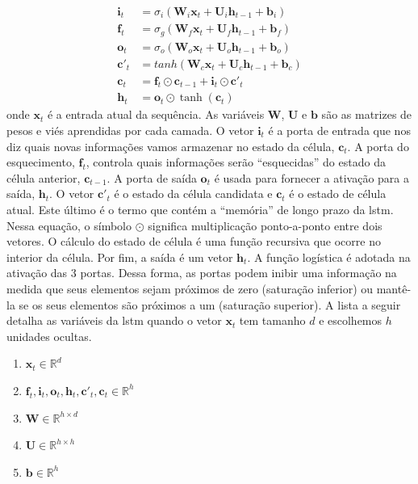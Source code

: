 \begin{equation}
\label{eq:lstm}
\begin{aligned}
\textbf{i}_t &= \sigma_{i}(\textbf{W}_i\textbf{x}_t + \textbf{U}_i\textbf{h}_{t-1} + \textbf{b}_i) \\
\textbf{f}_t &= \sigma_{g}(\textbf{W}_f\textbf{x}_t + \textbf{U}_f\textbf{h}_{t-1} + \textbf{b}_f) \\
\textbf{o}_t &= \sigma_{o}(\textbf{W}_o\textbf{x}_t + \textbf{U}_o\textbf{h}_{t-1} + \textbf{b}_o) \\   
\textbf{c}'_t &= tanh(\textbf{W}_c\textbf{x}_t + \textbf{U}_c\textbf{h}_{t-1} + \textbf{b}_c) \\
\textbf{c}_t &= \textbf{f}_t \odot \textbf{c}_{t-1} + \textbf{i}_t \odot \textbf{c}'_t \\
\textbf{h}_t & = \textbf{o}_t \odot \tanh(\textbf{c}_t)  
\end{aligned}
\end{equation}
\noindent onde $\textbf{x}_t$ é a entrada atual da sequência. As variáveis $\textbf{W}$, $\textbf{U}$ e $\textbf{b}$  são as matrizes de pesos e viés aprendidas por cada camada.  O vetor $\textbf{i}_{t}$ é a porta de entrada que nos diz quais novas informações vamos armazenar no estado da célula, $\textbf{c}_{t}$. 
A porta do esquecimento, $\textbf{f}_{t}$, controla quais informações serão ``esquecidas'' do estado da célula anterior, $\textbf{c}_{t-1}$. A porta de saída $\textbf{o}_{t}$ é usada para fornecer a ativação para a saída, $\textbf{h}_{t}$. O vetor $\textbf{c}'_{t}$ é o estado da célula candidata e $\textbf{c}_{t}$ é o estado de célula atual.  Este último é o termo que contém a ``memória'' de longo prazo da \acrshort{lstm}. Nessa equação, o símbolo $\odot$ significa multiplicação ponto-a-ponto entre dois vetores. O cálculo do estado de célula é uma função recursiva que ocorre no interior da célula. Por fim, a saída é um  vetor $\textbf{h}_{t}$.
A função logística é adotada na ativação das 3 portas.  Dessa forma, as portas podem inibir uma informação na medida que seus elementos sejam próximos de zero (saturação inferior) ou mantê-la se os seus elementos são próximos a um (saturação superior). A lista a seguir detalha as variáveis da \acrshort{lstm} quando o vetor $\textbf{x}_t$ tem tamanho $d$ e escolhemos $h$ unidades ocultas.    


\begin{enumerate}
	\item $\textbf{x}_t \in \mathbb{R}^{d}$
	\item $\textbf{f}_t,\textbf{i}_t,\textbf{o}_t,\textbf{h}_t,\textbf{c}'_t,\textbf{c}_t \in \mathbb{R}^{h}$ 
	\item $\textbf{W} \in \mathbb{R}^{h \times d} $
	\item $\textbf{U} \in \mathbb{R}^{h \times h}$
	\item $\textbf{b} \in \mathbb{R}^{h}$
\end{enumerate}

